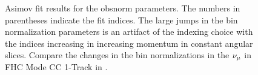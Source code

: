 \begin{figure}
\begin{centering}
\par\end{centering}
\begin{centering}
\par\end{centering}
\caption[Asimov Fit Results for the Bin Normalization Parameters]{Asimov fit results for the obsnorm parameters. The numbers in parentheses
indicate the fit indices. The large jumps in the bin normalization
parameters is an artifact of the indexing choice with the indices
increasing in increasing momentum in constant angular slices. Compare
the changes in the bin normalizations in the $\protect\nu_{\mu}$ in FHC
Mode CC 1-Track in .
\label{fig:Asimov-fit-resultsObsnorm}}
\end{figure}

